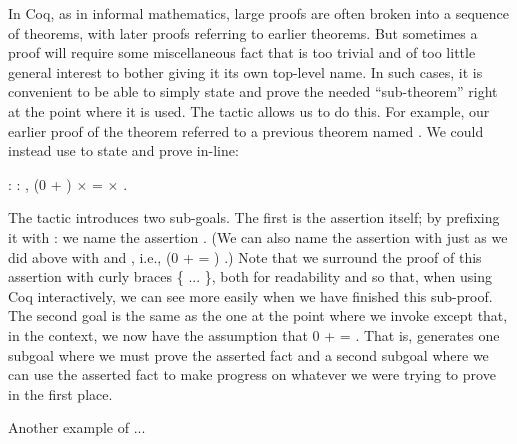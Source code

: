\documentclass[12pt]{report}
\begin{document}
 In Coq, as in informal mathematics, large proofs are often
    broken into a sequence of theorems, with later proofs referring to
    earlier theorems.  But sometimes a proof will require some
    miscellaneous fact that is too trivial and of too little general
    interest to bother giving it its own top-level name.  In such
    cases, it is convenient to be able to simply state and prove the
    needed ``sub-theorem'' right at the point where it is used.  The
     tactic allows us to do this.  For example, our earlier
    proof of the  theorem referred to a previous theorem
    named .  We could instead use  to state and
    prove  in-line: \begin{coqdoccode}
\coqdocemptyline
\coqdocnoindent
{}  : \coqdockw{\ensuremath{\forall}}   : ,\coqdoceol
\coqdocindent{1.00em}
(0 + ) \ensuremath{\times}  =  \ensuremath{\times} .\coqdoceol
\coqdocemptyline
\end{coqdoccode}
The  tactic introduces two sub-goals.  The first is
    the assertion itself; by prefixing it with : we name the
    assertion .  (We can also name the assertion with  just as
    we did above with  and , i.e.,  (0 + 
    = )  .)  Note that we surround the proof of this assertion
    with curly braces \{ ... \}, both for readability and so that,
    when using Coq interactively, we can see more easily when we have
    finished this sub-proof.  The second goal is the same as the one
    at the point where we invoke  except that, in the context,
    we now have the assumption  that 0 +  = .  That is,
     generates one subgoal where we must prove the asserted
    fact and a second subgoal where we can use the asserted fact to
    make progress on whatever we were trying to prove in the first
    place. 

 Another example of ... 
\end{document}
